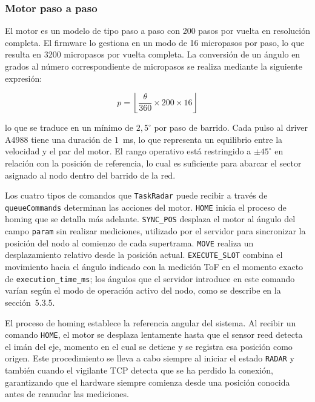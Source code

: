 
\subsubsection*{Motor paso a paso}

El motor es un modelo de tipo paso a paso con 200 pasos por vuelta en resolución completa. El firmware lo gestiona en un modo de 16 micropasos por paso, lo que resulta en 3200 micropasos por vuelta completa. La conversión de un ángulo en grados al número correspondiente de micropasos se realiza mediante la siguiente expresión:

\begin{equation}
p = \left\lfloor \frac{\theta}{360} \times 200 \times 16 \right\rfloor
\label{eq:motor_steps}
\end{equation}

lo que se traduce en un mínimo de $2{,}5^\circ$ por paso de barrido. Cada pulso al driver A4988 tiene una duración de 1~ms, lo que representa un equilibrio entre la velocidad y el par del motor. El rango operativo está restringido a $\pm 45^\circ$ en relación con la posición de referencia, lo cual es suficiente para abarcar el sector asignado al nodo dentro del barrido de la red.

Los cuatro tipos de comandos que \texttt{TaskRadar} puede recibir a través de \texttt{queueCommands} determinan las acciones del motor. \texttt{HOME} inicia el proceso de homing que se detalla más adelante. \texttt{SYNC\_POS} desplaza el motor al ángulo del campo \texttt{param} sin realizar mediciones, utilizado por el servidor para sincronizar la posición del nodo al comienzo de cada supertrama. \texttt{MOVE} realiza un desplazamiento relativo desde la posición actual. \texttt{EXECUTE\_SLOT} combina el movimiento hacia el ángulo indicado con la medición ToF en el momento exacto de \texttt{execution\_time\_ms}; los ángulos que el servidor introduce en este comando varían según el modo de operación activo del nodo, como se describe en la sección~5.3.5.

El proceso de homing establece la referencia angular del sistema. Al recibir un comando \texttt{HOME}, el motor se desplaza lentamente hasta que el sensor reed detecta el imán del eje, momento en el cual se detiene y se registra esa posición como origen. Este procedimiento se lleva a cabo siempre al iniciar el estado \texttt{RADAR} y también cuando el vigilante TCP detecta que se ha perdido la conexión, garantizando que el hardware siempre comienza desde una posición conocida antes de reanudar las mediciones.

